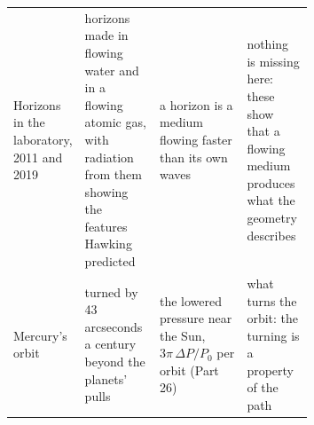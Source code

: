 \begin{table}[p]
\begin{tabularx}{\linewidth}{@{}>{\raggedright\arraybackslash}p{0.2\linewidth} >{\raggedright\arraybackslash}p{0.25\linewidth} >{\raggedright\arraybackslash}X >{\raggedright\arraybackslash}p{0.22\linewidth}@{}}
Horizons in the laboratory, 2011 and 2019 & horizons made in flowing water and in a flowing atomic gas, with radiation from them showing the features Hawking predicted & a horizon is a medium flowing faster than its own waves & nothing is missing here: these show that a flowing medium produces what the geometry describes\\
Mercury's orbit & turned by 43 arcseconds a century beyond the planets' pulls & the lowered pressure near the Sun, $3\pi\,\Delta P/P_0$ per orbit (Part 26) & what turns the orbit: the turning is a property of the path\\\bottomrule
\end{tabularx}\label{tab:gravity}\end{table}

\nocite{touboul2022,pound1960,vessot1980,chou2010,dyson1920,shapiro2004,shapiro1964,bertotti2003,everitt2011,abbott2017speed,weinfurtner2011,munoz2019,rashadaPart14,rashadaPart23,rashadaPart26}

